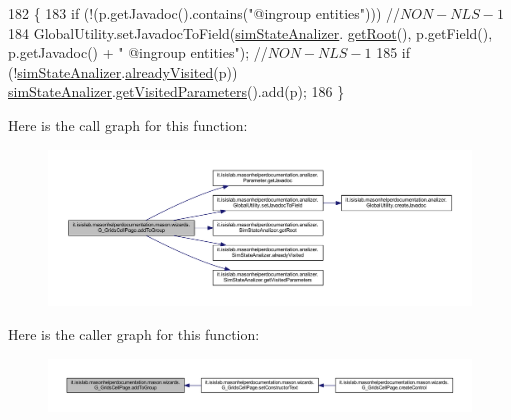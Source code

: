 \begin{DoxyCode}
182                                          \{
183         \textcolor{keywordflow}{if} (!(p.getJavadoc().contains(\textcolor{stringliteral}{"@ingroup entities"}))) \textcolor{comment}{//$NON-NLS-1$}
184             GlobalUtility.setJavadocToField(\hyperlink{classit_1_1isislab_1_1masonhelperdocumentation_1_1mason_1_1wizards_1_1_g___grids_cell_page_aadd93c2041dd8e74fd87a3a432504fa2}{simStateAnalizer}.
      \hyperlink{classit_1_1isislab_1_1masonhelperdocumentation_1_1analizer_1_1_sim_state_analizer_a87990fc6efb2a06013ff8489ede4dcdf}{getRoot}(), p.getField(), p.getJavadoc() + \textcolor{stringliteral}{" @ingroup entities"}); \textcolor{comment}{//$NON-NLS-1$}
185         \textcolor{keywordflow}{if} (!\hyperlink{classit_1_1isislab_1_1masonhelperdocumentation_1_1mason_1_1wizards_1_1_g___grids_cell_page_aadd93c2041dd8e74fd87a3a432504fa2}{simStateAnalizer}.\hyperlink{classit_1_1isislab_1_1masonhelperdocumentation_1_1analizer_1_1_sim_state_analizer_a384f244c6d532ff8120eb40868a97989}{alreadyVisited}(p))  
      \hyperlink{classit_1_1isislab_1_1masonhelperdocumentation_1_1mason_1_1wizards_1_1_g___grids_cell_page_aadd93c2041dd8e74fd87a3a432504fa2}{simStateAnalizer}.\hyperlink{classit_1_1isislab_1_1masonhelperdocumentation_1_1analizer_1_1_sim_state_analizer_a6a2c3cc8da53fb864eacebecfa5e7463}{getVisitedParameters}().add(p);     
186     \}
\end{DoxyCode}


Here is the call graph for this function\-:
\nopagebreak
\begin{figure}[H]
\begin{center}
\leavevmode
\includegraphics[width=350pt]{classit_1_1isislab_1_1masonhelperdocumentation_1_1mason_1_1wizards_1_1_g___grids_cell_page_a43c0ab8367d25f1cfd0cdc9e29f46e5c_cgraph}
\end{center}
\end{figure}




Here is the caller graph for this function\-:
\nopagebreak
\begin{figure}[H]
\begin{center}
\leavevmode
\includegraphics[width=350pt]{classit_1_1isislab_1_1masonhelperdocumentation_1_1mason_1_1wizards_1_1_g___grids_cell_page_a43c0ab8367d25f1cfd0cdc9e29f46e5c_icgraph}
\end{center}
\end{figure}


